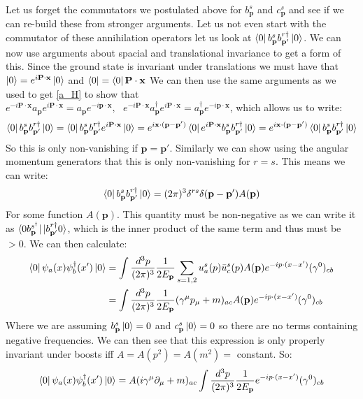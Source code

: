 \documentclass[11pt]{article}
\numberwithin{equation}{section}
\begin{document}
\begin{itemize}
Let us forget the commutators we postulated above for $b^{s}_{\textbf{p}}$ and $c^{s}_{\textbf{p}}$ and see if we can re-build these from stronger arguments. Let us not even start with the commutator of these annihilation operators let us look at $\bra{0}b^{s}_{\textbf{p}}b^{r \dagger}_{\textbf{p}'}\ket{0}$. We can now use arguments about spacial and translational invariance to get a form of this. Since the ground state is invariant under translations we must have that $\ket{0}=e^{i\textbf{P}\cdot \textbf{x}}\ket{0}$ and $\bra{0} = \bra{0}\textbf{P}\cdot \textbf{x}$ We can then use the same arguments as we used to get \ref{a_H} to show that $e^{-i\textbf{P}\cdot \textbf{x}}a_{\textbf{p}}e^{i\textbf{P}\cdot \textbf{x}} = a_{\textbf{p}}e^{-i\textbf{p}\cdot \textbf{x}},~~~e^{-i\textbf{P}\cdot \textbf{x}}a^{\dagger}_{\textbf{p}}e^{i\textbf{P}\cdot \textbf{x}} = a^{\dagger}_{\textbf{p}}e^{-i\textbf{p}\cdot \textbf{x}}$, which allows us to write:
\begin{align*}
  \bra{0}b^{s}_{\textbf{p}}b^{r \dagger}_{\textbf{p}'}\ket{0} = \bra{0}b^{s}_{\textbf{p}}b^{r \dagger}_{\textbf{p}'}e^{i\textbf{P}\cdot \textbf{x}}\ket{0} = e^{i\textbf{x}\cdot(\textbf{p}-\textbf{p}')}\bra{0}e^{i\textbf{P}\cdot \textbf{x}}b^{s}_{\textbf{p}}b^{r \dagger}_{\textbf{p}'}\ket{0}=e^{i\textbf{x}\cdot(\textbf{p}-\textbf{p}')}\bra{0}b^{s}_{\textbf{p}}b^{r \dagger}_{\textbf{p}'}\ket{0}
\end{align*}
So this is only non-vanishing if $\textbf{p}=\textbf{p}'$. Similarly we can show using the angular momentum generators that this is only non-vanishing for $r=s$. This means we can write:
\begin{align*}
  \bra{0}b^{s}_{\textbf{p}}b^{r \dagger}_{\textbf{p}'}\ket{0} = (2\pi)^3\delta^{rs}\delta(\textbf{p}-\textbf{p}')A(\textbf{p})
\end{align*}
For some function $A(\textbf{p})$. This quantity must be non-negative as we can write it as $\bra{0b^{s ^\dagger}_{\textbf{p}}}\ket{b^{r \dagger}_{\textbf{p}'}0}$, which is the inner product of the same term and thus must be $>0$. We can then calculate:
\begin{align*}
  \bra{0}\psi_a(x)\psi_b^{\dagger}(x')\ket{0} & = \int  \frac{d^3p}{(2\pi)^3}\frac{1}{2E_{\textbf{p}}}\sum_{s=1,2}u_a^{s}(p)\bar{u}_c^{s}(p)A(\textbf{p})e^{-ip \cdot (x-x')} (\gamma^{0})_{cb} \\ 
  &  = \int  \frac{d^3p}{(2\pi)^3}\frac{1}{2E_{\textbf{p}}}(\gamma^{\mu}p_{\mu}+m)_{ac}A(\textbf{p})e^{-ip\cdot (x-x')} (\gamma^{0})_{cb}
\end{align*}
Where we are assuming $b^{s}_{\textbf{p}}\ket{0} = 0$ and $c^{s}_{\textbf{p}}\ket{0}= 0$ so there are no terms containing negative frequencies. We can then see that this expression is only properly invariant under boosts iff $A = A(p^2) = A(m^2) = $ constant. So:
\begin{align}
\label{com_1}
  \bra{0}\psi_a(x)\psi_b^{\dagger}(x')\ket{0}= A(i\gamma^{\mu}\partial_{\mu}+m)_{ac}\int  \frac{d^3p}{(2\pi)^3}\frac{1}{2E_{\textbf{p}}}e^{-ip\cdot (x-x')} (\gamma^{0})_{cb}
\end{align}




\end{itemize}
\end{document}
